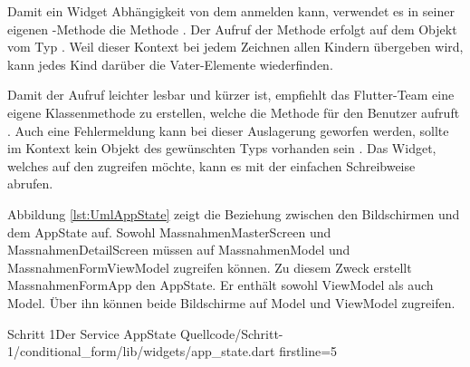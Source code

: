 Damit ein Widget Abhängigkeit von dem  anmelden kann, verwendet es in seiner eigenen -Methode die Methode .
Der Aufruf der Methode erfolgt auf dem Objekt vom Typ .
Weil dieser Kontext bei jedem Zeichnen allen Kindern übergeben wird, kann jedes Kind darüber die Vater-Elemente wiederfinden.

Damit der Aufruf leichter lesbar und kürzer ist, empfiehlt das Flutter-Team eine eigene Klassenmethode zu erstellen, welche die Methode für den Benutzer aufruft .
Auch eine Fehlermeldung kann bei dieser Auslagerung geworfen werden, sollte im Kontext kein Objekt des gewünschten Typs vorhanden sein .
Das Widget, welches auf den  zugreifen möchte, kann es mit der einfachen Schreibweise  abrufen.

Abbildung \ref{lst:UmlAppState} zeigt die Beziehung zwischen den Bildschirmen und dem AppState auf.
Sowohl MassnahmenMasterScreen und MassnahmenDetailScreen müssen auf MassnahmenModel und MassnahmenFormViewModel zugreifen können.
Zu diesem Zweck erstellt MassnahmenFormApp den AppState.
Er enthält sowohl ViewModel als auch Model.
Über ihn können beide Bildschirme auf Model und ViewModel zugreifen.



\begin{alexlisting}{Schritt 1}{Der Service AppState}
  {Quellcode/Schritt-1/conditional_form/lib/widgets/app_state.dart}
  {firstline=5}
  \label{lst:Schritt1DerServiceAppState}
\end{alexlisting}


